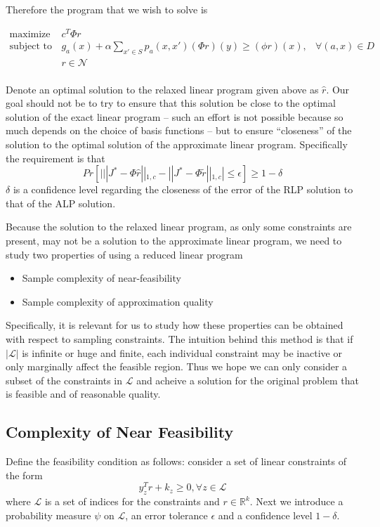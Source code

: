 \documentclass[12pt,reqno]{amsart}
\newcommand{\R}{\ensuremath{\mathbb{R}}}
\newcommand{\sN}{\mathcal{N}}
\newcommand{\sL}{\mathcal{L}}
\numberwithin{equation}{section}
\begin{document}
Therefore the program that we wish to solve is

\begin{align*}
\text{maximize } & c^T \Phi r & \\
\text{subject to } & g_a(x) + \alpha \sum_{x' \in S} p_a(x,x')(\Phi r)(y) \geq (\phi r) (x), & \forall (a,x) \in D \\
& r \in \sN & \\
\end{align*}


Denote an optimal solution to the relaxed linear program given above as $\hat{r}$. Our goal should not be to try to ensure that this solution be close to the optimal solution of the exact linear program -- such an effort is not possible because so much depends on the choice of basis functions -- but to ensure ``closeness'' of the solution to the optimal solution of the approximate linear program. Specifically the requirement is that
$$
Pr[ | ||J^* - \Phi\hat{r}||_{1,c} - ||J^* - \Phi \tilde{r}||_{1,c}| \leq \epsilon ] \geq 1 -\delta
$$
$\delta$ is a confidence level regarding the closeness of the error of the RLP solution to that of the ALP solution.

Because the solution to the relaxed linear program, as only some constraints are present, may not be a solution to the approximate linear program, we need to study two properties of using a reduced linear program
\begin{itemize}
\item Sample complexity of near-feasibility
\item Sample complexity of approximation quality
\end{itemize}

Specifically, it is relevant for us to study how these properties can be obtained with respect to sampling constraints. The intuition behind this method is that if $|\sL|$ is infinite or huge and finite, each individual constraint may be inactive or only marginally affect the feasible region. Thus we hope we can only consider a subset of the constraints in $\sL$ and acheive a solution for the original problem that is feasible and of reasonable quality.

\subsection{Complexity of Near Feasibility}
Define the feasibility condition as follows: consider a set of linear constraints of the form
$$
y_z^T r + k_z \geq 0, \forall z \in \sL
$$
where $\sL$ is a set of indices for the constraints and $r \in \R^k$. Next we introduce a probability measure $\psi$ on $\sL$, an error tolerance $\epsilon$ and a confidence level $1-\delta$. 
\end{document}
